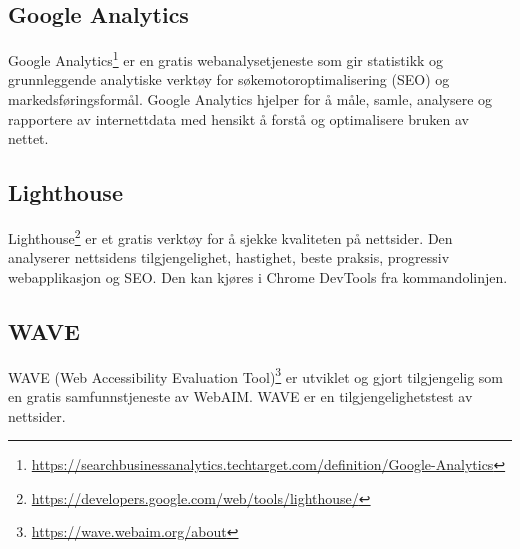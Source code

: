 \subsection{Google Analytics}
Google Analytics\footnote{\url{https://searchbusinessanalytics.techtarget.com/definition/Google-Analytics}} er en gratis webanalysetjeneste som gir statistikk og grunnleggende analytiske verktøy for søkemotoroptimalisering (SEO) og markedsføringsformål. Google Analytics hjelper for å måle, samle, analysere og rapportere av internettdata med hensikt å forstå og optimalisere bruken av nettet.

\subsection{Lighthouse}
Lighthouse\footnote{\url{https://developers.google.com/web/tools/lighthouse/}} er et gratis verktøy for å sjekke kvaliteten på nettsider. Den analyserer nettsidens tilgjengelighet, hastighet, beste praksis, progressiv webapplikasjon og SEO. Den kan kjøres i Chrome DevTools fra kommandolinjen.

\subsection{WAVE}
WAVE (Web Accessibility Evaluation Tool)\footnote{
\url{https://wave.webaim.org/about}} er utviklet og gjort tilgjengelig som en gratis samfunnstjeneste av WebAIM. WAVE er en tilgjengelighetstest av nettsider.

\clearpage